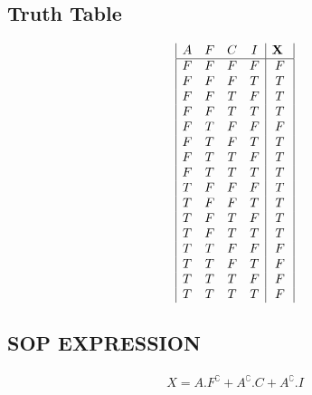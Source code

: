 \documentclass{article}
\begin{document}
\subsection{Truth Table}
\begin{displaymath}
\begin{array}{|c c c c |c|}
A & F & C &I &\textbf{X } \\ %
\hline %
F & F & F & F & F \\
F & F & F & T & T \\
F & F & T & F & T \\
F & F & T & T & T \\
F & T & F & F & F \\
F & T & F & T & T \\
F & T & T & F & T \\
F & T & T & T & T \\
T & F & F & F & T \\
T & F & F & T & T \\
T & F & T & F & T \\
T & F & T & T & T \\
T & T & F & F & F \\
T & T & F & T & F \\
T & T & T & F & F \\
T & T & T & T & F \\



\end{array}
\end{displaymath}

\subsection{SOP EXPRESSION}
      \begin{align}
         X=A.F^\complement +A^\complement.C +A^\complement.I 
      \end{align}     
      
   
\end{document}
